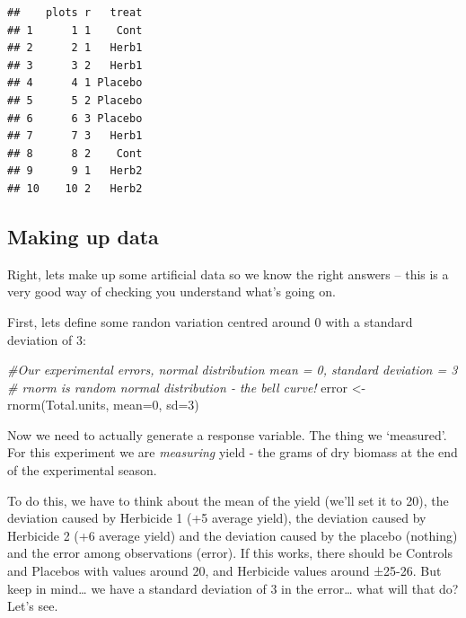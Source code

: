 \documentclass[
]{book}
\newenvironment{Shaded}{\begin{snugshade}}{\end{snugshade}}
\newcommand{\AttributeTok}[1]{\textcolor[rgb]{0.77,0.63,0.00}{#1}}
\newcommand{\CommentTok}[1]{\textcolor[rgb]{0.56,0.35,0.01}{\textit{#1}}}
\newcommand{\DecValTok}[1]{\textcolor[rgb]{0.00,0.00,0.81}{#1}}
\newcommand{\FunctionTok}[1]{\textcolor[rgb]{0.00,0.00,0.00}{#1}}
\newcommand{\NormalTok}[1]{#1}
\newcommand{\OtherTok}[1]{\textcolor[rgb]{0.56,0.35,0.01}{#1}}
\begin{document}
\begin{verbatim}
##    plots r   treat
## 1      1 1    Cont
## 2      2 1   Herb1
## 3      3 2   Herb1
## 4      4 1 Placebo
## 5      5 2 Placebo
## 6      6 3 Placebo
## 7      7 3   Herb1
## 8      8 2    Cont
## 9      9 1   Herb2
## 10    10 2   Herb2
\end{verbatim}

\hypertarget{making-up-data}{%
\subsection{Making up data}\label{making-up-data}}

Right, lets make up some artificial data so we know the right answers -- this is a very good way of checking you understand what's going on.

First, lets define some randon variation centred around 0 with a standard deviation of 3:

\begin{Shaded}
\begin{Highlighting}[]
\CommentTok{\#Our experimental errors, normal distribution mean = 0, standard deviation = 3}
\CommentTok{\# rnorm is random normal distribution {-} the bell curve!}
\NormalTok{error }\OtherTok{\textless{}{-}} \FunctionTok{rnorm}\NormalTok{(Total.units, }\AttributeTok{mean=}\DecValTok{0}\NormalTok{, }\AttributeTok{sd=}\DecValTok{3}\NormalTok{)}
\end{Highlighting}
\end{Shaded}

Now we need to actually generate a response variable. The thing we `measured'. For this experiment we are \emph{measuring} yield - the grams of dry biomass at the end of the experimental season.

To do this, we have to think about the mean of the yield (we'll set it to 20), the deviation caused by Herbicide 1 (+5 average yield), the deviation caused by Herbicide 2 (+6 average yield) and the deviation caused by the placebo (nothing) and the error among observations (error). If this works, there should be Controls and Placebos with values around 20, and Herbicide values around ±25-26. But keep in mind\ldots{} we have a standard deviation of 3 in the error\ldots{} what will that do? Let's see.
\end{document}
